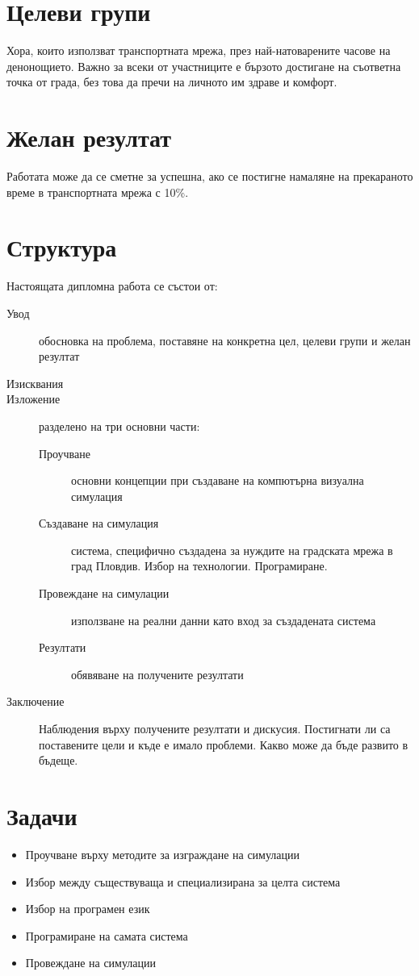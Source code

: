 \section{Целеви групи}

Хора, които използват транспортната мрежа, през най-натоварените часове на денонощието. Важно за всеки от участниците е бързото достигане на съответна точка от града, без това да пречи на личното им здраве и комфорт.

\section{Желан резултат}

Работата може да се сметне за успешна, ако се постигне намаляне на прекараното време в транспортната мрежа с 10\%.

\section{Структура}

Настоящата дипломна работа се състои от:

\begin{description}

\item[Увод] обосновка на проблема, поставяне на конкретна цел, целеви групи и желан резултат

\item[Изисквания]

\item[Изложение] разделено на три основни части:

\begin{description}

\item[Проучване] основни концепции при създаване на компютърна визуална симулация
\item[Създаване на симулация] система, специфично създадена за нуждите на градската мрежа в град Пловдив. Избор на технологии. Програмиране.
\item[Провеждане на симулации] използване на реални данни като вход за създадената система
\item[Резултати] обявяване на получените резултати

\end{description}

\item[Заключение] Наблюдения върху получените резултати и дискусия. Постигнати ли са поставените цели и къде е имало проблеми. Какво може да бъде развито в бъдеще.
\end{description}

\section{Задачи}
\begin{itemize}
\item Проучване върху методите за изграждане на симулации
\item Избор между съществуваща и специализирана за целта система
\item Избор на програмен език
\item Програмиране на самата система
\item Провеждане на симулации
\end{itemize}